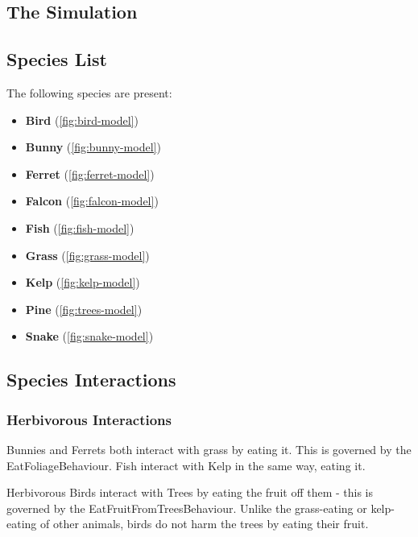 \documentclass{article}
\begin{document}
    \begin{multicols}{2}
        \section{The Simulation}

        \subsection{Species List}

            The following species are present:

            \begin{itemize}
                \setlength\itemsep{0.01em}
                \item \textbf{Bird} (\autoref{fig:bird-model})
                \item \textbf{Bunny} (\autoref{fig:bunny-model})
                \item \textbf{Ferret} (\autoref{fig:ferret-model})
                \item \textbf{Falcon} (\autoref{fig:falcon-model})
                \item \textbf{Fish} (\autoref{fig:fish-model})
                \item \textbf{Grass} (\autoref{fig:grass-model})
                \item \textbf{Kelp} (\autoref{fig:kelp-model})
                \item \textbf{Pine} (\autoref{fig:trees-model})
                \item \textbf{Snake} (\autoref{fig:snake-model})
            \end{itemize}

        \subsection{Species Interactions}

            \subsubsection{Herbivorous Interactions}
            
            Bunnies and Ferrets both interact with grass by eating it. This is governed by the EatFoliageBehaviour. Fish interact with Kelp in the same way, eating it.
            
            Herbivorous Birds interact with Trees by eating the fruit off them - this is governed by the EatFruitFromTreesBehaviour. Unlike the grass-eating or kelp-eating of other animals, birds do not harm the trees by eating their fruit.
            

\end{multicols}
\end{document}
